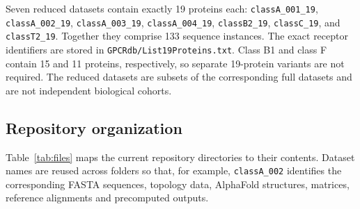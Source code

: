 \documentclass[a4paper,12pt]{article}
\begin{document}
	Seven reduced datasets contain exactly 19 proteins each: \texttt{classA\_001\_19}, \texttt{classA\_002\_19}, \texttt{classA\_003\_19}, \texttt{classA\_004\_19}, \texttt{classB2\_19}, \texttt{classC\_19}, and \texttt{classT2\_19}. Together they comprise 133 sequence instances. The exact receptor identifiers are stored in \texttt{GPCRdb/List19Proteins.txt}. Class B1 and class F contain 15 and 11 proteins, respectively, so separate 19-protein variants are not required. The reduced datasets are subsets of the corresponding full datasets and are not independent biological cohorts.
	
	\subsection*{Repository organization}
	Table~\ref{tab:files} maps the current repository directories to their contents. Dataset names are reused across folders so that, for example, \texttt{classA\_002} identifies the corresponding FASTA sequences, topology data, AlphaFold structures, matrices, reference alignments and precomputed outputs.
	
\end{document}
